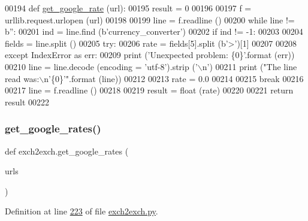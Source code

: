 \begin{DoxyCode}
00194 \textcolor{keyword}{def }\hyperlink{namespaceexch2exch_a20ad08d045d52bdcb3977eaa8f951622}{get\_google\_rate} (url):
00195     result = 0
00196 
00197     f = urllib.request.urlopen (url)
00198     
00199     line = f.readline ()
00200     \textcolor{keywordflow}{while} line != b\textcolor{stringliteral}{''}:
00201         ind = line.find (b\textcolor{stringliteral}{'currency\_converter'})
00202         \textcolor{keywordflow}{if} ind != -1:
00203             
00204             fields = line.split ()
00205             \textcolor{keywordflow}{try}:
00206                 rate = fields[5].split (b\textcolor{stringliteral}{'>'})[1]
00207                 
00208             \textcolor{keywordflow}{except} IndexError \textcolor{keyword}{as} err:
00209                 \textcolor{keywordflow}{print} (\textcolor{stringliteral}{'Unexpected problem: \{0\}'}.format (err))
00210                 line = line.decode (encoding = \textcolor{stringliteral}{'utf-8'}).strip (\textcolor{stringliteral}{'\(\backslash\)n'})
00211                 \textcolor{keywordflow}{print} (\textcolor{stringliteral}{"The line read was:\(\backslash\)n'\{0\}'"}.format (line))
00212                 
00213                 rate = 0.0
00214             
00215             \textcolor{keywordflow}{break}
00216             
00217         line = f.readline ()
00218     
00219     result = float (rate)
00220     
00221     \textcolor{keywordflow}{return} result
00222     
\end{DoxyCode}
\mbox{\label{namespaceexch2exch_ae0891a93a4a9cfe932011afddd41808d}} 
\subsubsection{\texorpdfstring{get\+\_\+google\+\_\+rates()}{get\_google\_rates()}}
{\footnotesize\ttfamily def exch2exch.\+get\+\_\+google\+\_\+rates (\begin{DoxyParamCaption}\item[{}]{urls }\end{DoxyParamCaption})}



Definition at line \hyperlink{exch2exch_8py_source_l00223}{223} of file \hyperlink{exch2exch_8py_source}{exch2exch.\+py}.


